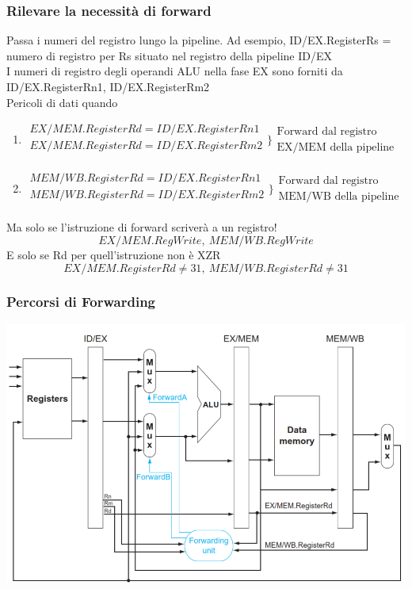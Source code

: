 \documentclass[12pt,a4paper]{article}
\begin{document}
\subsubsection{Rilevare la necessità di forward}
Passa i numeri del registro lungo la pipeline. Ad esempio, ID/EX.RegisterRs = numero di registro per Rs situato nel registro della pipeline ID/EX\\
I numeri di registro degli operandi ALU nella fase EX sono forniti da ID/EX.RegisterRn1, ID/EX.RegisterRm2\\
Pericoli di dati quando
\begin{enumerate}
\item $\begin{array}{l}
EX/MEM.RegisterRd = ID/EX.RegisterRn1\\
EX/MEM.RegisterRd = ID/EX.RegisterRm2\\
\end{array}\Bigg\} \begin{array}{l}\text{Forward dal registro}\\ \text{EX/MEM della pipeline}\end{array}$
\item $\begin{array}{l}
MEM/WB.RegisterRd = ID/EX.RegisterRn1\\
MEM/WB.RegisterRd = ID/EX.RegisterRm2\\
\end{array}\Bigg\}\begin{array}{l}\text{Forward dal registro}\\ \text{MEM/WB della pipeline}\end{array}$
\end{enumerate}
Ma solo se l'istruzione di forward scriverà a un registro!
$$EX/MEM.RegWrite,\ MEM/WB.RegWrite$$
E solo se Rd per quell'istruzione non è XZR
$$EX/MEM.RegisterRd \not = 31,\ MEM/WB.RegisterRd \not = 31$$

\subsubsection{Percorsi di Forwarding}
\begin{center}
\includegraphics[width=0.7\columnwidth]{img/fwd_paths.png}
\end{center}
\end{document}
